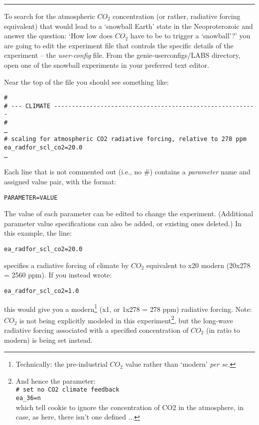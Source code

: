 \vspace{1mm}\noindent\rule{4cm}{0.5pt}\vspace{2mm}

\noindent To search for the atmospheric \(CO_{2}\) concentration (or rather, radiative forcing equivalent) that would lead to a ‘snowball Earth’ state in the Neoproterozoic and answer the question:
‘How low does \(CO_{2}\) have to be to trigger a ‘snowball’?’
you are going to edit the experiment file that controls the specific details of the experiment -- the \textit{user-config} file. From the \textsf{\footnotesize genie-userconfigs/LABS} directory, open one of the snowball experiments in your preferred  text editor. 

Near the top of the file you should see something like:

\vspace{-2mm}\footnotesize\begin{verbatim}
#
# --- CLIMATE ---------------------------------------------------------
#
…
# scaling for atmospheric CO2 radiative forcing, relative to 278 ppm
ea_radfor_scl_co2=20.0
…
\end{verbatim}\normalsize\vspace{-1mm}

Each line that is not commented out (i.e., no \#) contains a \textit{parameter} name and assigned value pair, with the format:
\vspace{-1mm}
\small\begin{verbatim}
PARAMETER=VALUE
\end{verbatim}\normalsize
\vspace{-1mm}
The value of each parameter can be edited to change the experiment. (Additional parameter value specifications can also be added, or existing ones deleted.) In this example, the line:
\vspace{-1mm}
\small\begin{verbatim}
ea_radfor_scl_co2=20.0
\end{verbatim}\normalsize
\vspace{-1mm}
specifies a radiative forcing of climate by \(CO_{2}\) equivalent to x20 modern (20x278 = 2560 ppm). If you instead wrote:
\vspace{-1mm}
\small\begin{verbatim}
ea_radfor_scl_co2=1.0
\end{verbatim}\normalsize
\vspace{-1mm}
this would give you a modern\footnote{Technically: the pre-industrial \(CO_{2}\) value rather than ‘modern’ \textit{per se.}} (x1, or 1x278 = 278 ppm) radiative forcing.
Note: \(CO_{2}\) is not being explicitly modeled in this experiment\footnote{And hence the parameter:
\\\texttt{\# set no CO2 climate feedback}
\\\texttt{ea\_36=n}
\\which tell cookie to ignore the concentration of CO2 in the atmosphere, in case, as here, there isn't one defined ...}, but the long-wave radiative forcing associated with a specified concentration of \(CO_{2}\) (in ratio to modern) is being set instead.


